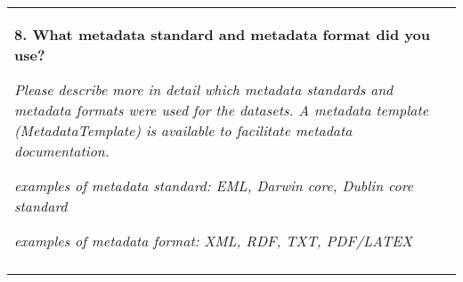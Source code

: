 \documentclass[12pt]{article}
\begin{document}
\begin{table}[H]
 			\centering
\begin{tabular}{p{5.99in}}
\hline
\multicolumn{1}{|p{5.99in}|}{\textbf{8. What metadata standard and metadata format did you use?} 
\par \textit{{Please describe more in detail which metadata standards and metadata formats were used for the datasets. A metadata template (MetadataTemplate) is available to facilitate metadata documentation.}}
\par \textit{{examples of metadata standard: EML, Darwin core, Dublin core standard}}
\par \textit{{examples of metadata format: XML, RDF, TXT, PDF/LATEX}}} \\
\hhline{-}
\end{tabular}
\end{table}

\end{document}
